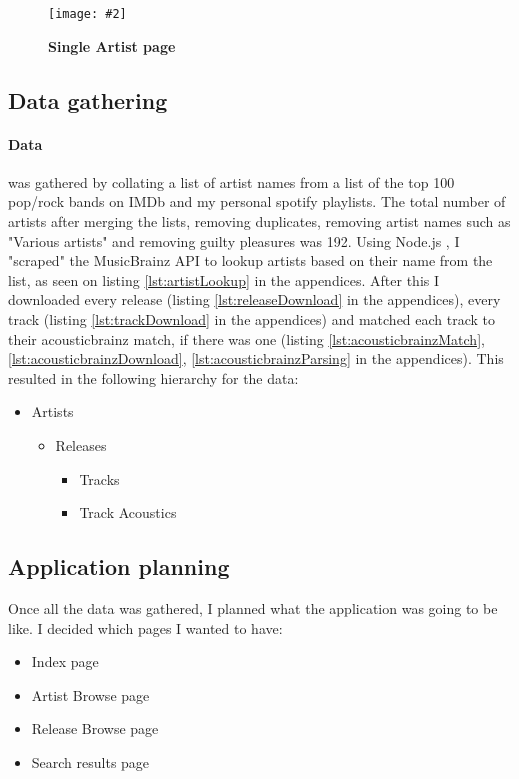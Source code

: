 \documentclass[10pt, a4paper]{article}
\newcommand{\figuremacro}[5]{
    \begin{figure}[#1]
        \centering
        \texttt{[image: \#2]}
        \caption[#3]{\textbf{#3}#4}
        \label{fig:#2}
    \end{figure}
}
\begin{document}
    \figuremacro{h}{artist-page}{Single Artist page}{}{1.0}
    
	\subsection{Data gathering}
	\paragraph{Data} was gathered by collating a list of artist names from a list of the top 100 pop/rock bands on IMDb \cite{100bands} and my personal spotify playlists.
	The total number of artists after merging the lists, removing duplicates, removing artist names such as "Various artists" and removing guilty pleasures was 192.
	Using Node.js \cite{nodejs}, I "scraped" the MusicBrainz API to lookup artists based on their name from the list, as seen on listing \ref{lst:artistLookup} in the appendices.
	After this I downloaded every release (listing \ref{lst:releaseDownload} in the appendices), every track (listing \ref{lst:trackDownload} in the appendices) and matched each track to their acousticbrainz match, if there was one (listing \ref{lst:acousticbrainzMatch}, \ref{lst:acousticbrainzDownload}, \ref{lst:acousticbrainzParsing} in the appendices).
	This resulted in the following hierarchy for the data:
	\begin{itemize}
	\item Artists
		\begin{itemize}
		\item Releases
			\begin{itemize}
			\item Tracks
			\item Track Acoustics
			\end{itemize}
		\end{itemize}
	\end{itemize}
    
    
	\subsection{Application planning}
	Once all the data was gathered, I planned what the application was going to be like. I decided which pages I wanted to have:

	\begin{itemize}
	\item Index page
	\item Artist Browse page
	\item Release Browse page
	\item Search results page
	\end{itemize}
    
\end{document}
